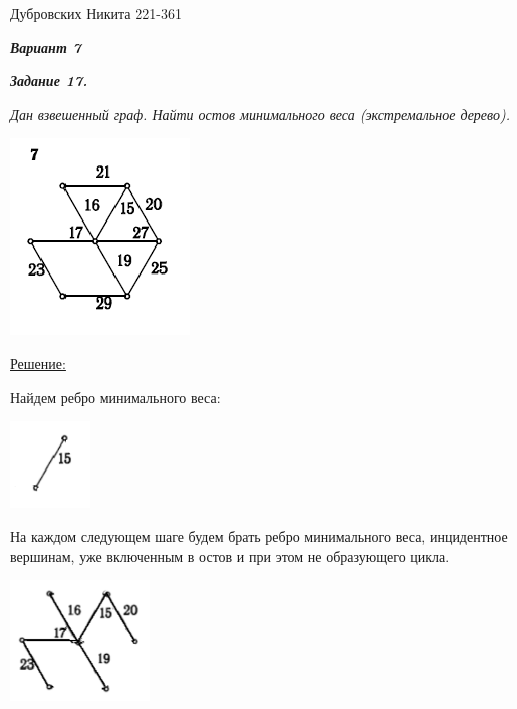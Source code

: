 \documentclass[12pt]{article}
\begin{document}
Дубровских Никита 221-361

\textit{\textbf{Вариант 7}}

\textit{\textbf{Задание 17.}}

\textit{Дан взвешенный граф. Найти остов минимального веса
(экстремальное дерево). }

\begin{center}
\includegraphics{17.png}
\end{center}

\underline{Решение:}

Найдем ребро минимального веса:

\begin{center}
	\includegraphics[width=80]{17_1.png}
\end{center}

На
каждом следующем шаге будем брать ребро минимального веса, инцидентное
вершинам, уже включенным в остов и при этом не образующего цикла.

\begin{center}
	\includegraphics[width=140]{17_2.png}
\end{center}
\end{document}
